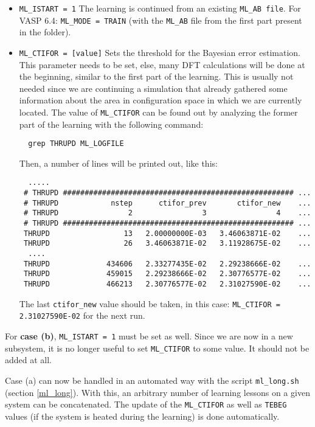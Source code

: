 \documentclass[a4paper,11pt]{article}
\begin{document}
\begin{itemize}
 \item \texttt{ML\_ISTART = 1} The learning is continued from an existing \texttt{ML\_AB file}. For VASP 6.4: \texttt{ML\_MODE = TRAIN} (with the \texttt{ML\_AB} file from the first part present in the folder).
\item \texttt{ML\_CTIFOR = [value]} Sets the threshold for the Bayesian error estimation. This parameter needs to be set,
 else, many DFT calculations will be done at the beginning, similar to the first part of the learning. This is usually not needed 
 since we are continuing a simulation that already gathered some information about the area in configuration
 space in which we are currently located.
 The value of \texttt{ML\_CTIFOR} can be found out by analyzing the former part of the learning with the following command:
 \begin{verbatim}
  grep THRUPD ML_LOGFILE
 \end{verbatim}
 Then, a number of lines will be printed out, like this:
 \begin{verbatim}
  .....
 # THRUPD ##################################################### ...
 # THRUPD            nstep      ctifor_prev       ctifor_new    ... 
 # THRUPD                2                3                4    ...
 # THRUPD ##################################################### ...
 THRUPD                 13   2.00000000E-03   3.46063871E-02    ...
 THRUPD                 26   3.46063871E-02   3.11928675E-02    ...
  ....
 THRUPD             434606   2.33277435E-02   2.29238666E-02    ...
 THRUPD             459015   2.29238666E-02   2.30776577E-02    ...
 THRUPD             466213   2.30776577E-02   2.31027590E-02    ...
 \end{verbatim}
 The last \texttt{ctifor\_new} value should be taken, in this case: \texttt{ML\_CTIFOR = 2.31027590E-02} for the next run.
 \end{itemize}

 For \textbf{case (b)}, \texttt{ML\_ISTART = 1} must be set as well. Since we are now in a new subsystem, it is no
 longer useful to set \texttt{ML\_CTIFOR} to some value. It should not be added at all.
 
 Case (a) can now be handled in an automated way with the script \texttt{ml\_long.sh} (section \ref{ml_long}).
 With this, an arbitrary number of 
 learning lessons on a given system can be concatenated. The update of the \texttt{ML\_CTIFOR} as well as \texttt{TEBEG} values
 (if the system is heated during the learning) is done automatically.
\end{document}
